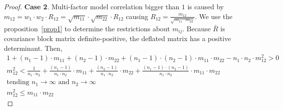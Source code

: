 \documentclass[11pt,fleqn]{book} %
\begin{document}
\begin{proof}
	\textbf{Case 2}. Multi-factor model correlation bigger than $1$ is caused
	by $m_{12} = w_1 \cdot w_2 \cdot R_{12} = \sqrt{m_{11}} \cdot \sqrt{m_{22}} \cdot R_{12}$
	causing $R_{12} = \frac{m_{12}}{\sqrt{m_{11} \cdot m_{22}}}$.
	We use the proposition~\ref{prop1} to determine the restrictions about $m_{ij}$. 
	Because $\bar{R}$ is covariance block matrix definite-positive, the deflated 
	matrix has a positive determinant. Then,
	\begin{displaymath}
		\begin{array}{l}
			1 + (n_1-1) \cdot m_{11} + (n_2-1) \cdot m_{22} +                     
			(n_1-1) \cdot (n_2-1) \cdot m_{11} \cdot m_{22} -                     
			n_1 \cdot n_2 \cdot m_{12}^2 > 0                                      
			                                                                      \\
			m_{12}^2 <                                                            
			\frac{1}{n_1 \cdot n_2} +                                             
			\frac{(n_1-1)}{n_1 \cdot n_2} \cdot m_{11} +                          
			\frac{(n_2-1)}{n_1 \cdot n_2} \cdot m_{22} +                          
			\frac{(n_1-1) \cdot (n_2-1)}{n_1 \cdot n_2} \cdot m_{11} \cdot m_{22} 
			                                                                      \\
			\text{tending } n_1 \to \infty \text{ and } n_2 \to \infty            
			                                                                      \\
			m_{12}^2 \le m_{11} \cdot m_{22}                                      
		\end{array}
	\end{displaymath}
\end{proof}


\end{document}
